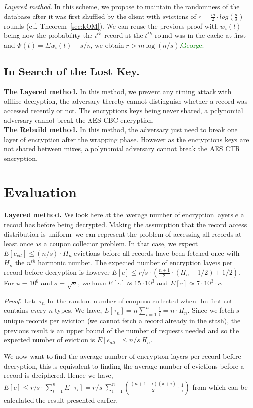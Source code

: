 \documentclass[USenglish,oneside,twocolumn]{article}
\newcommand{\george}[1]{\textcolor{green}{George: #1}}
\begin{document}
\noindent\textit{Layered method.}
In this scheme, we propose to maintain the randomness of the database after it was first shuffled by the client with evictions of $r=\frac{m}{2} \cdot log\left ( \frac{n}{s} \right )$ rounds (c.f. Theorem~\ref{sec:kOM}).
We can reuse the previous proof with $w_i(t)$ being now the probability the $i^{th}$ record at the $t^{th}$ round was in the cache at first and $\Phi(t)=\Sigma w_i(t) - s/n$, we obtain $r>m\log(n/s)$.\george{}

\subsection{In Search of the Lost Key.}
 
\noindent\textbf{The Layered method.}
In this method, we prevent any timing attack with offline decryption, the adversary thereby cannot distinguish whether a record was accessed recently or not. The encryptions keys being never shared, a polynomial adversary cannot break the AES CBC encryption.\\

\noindent\textbf{The Rebuild method.}
In this method, the adversary just need to break one layer of encryption after the wrapping phase. However as the encryptions keys are not shared between mixes, a polynomial adversary cannot break the AES CTR encryption.

\section{Evaluation}\label{Evaluation}
\textbf{Layered method.} We look here at the average number of encryption layers $e$ a record has before being decrypted. Making the assumption that the record access distribution is uniform, we can represent the problem of accessing all records at least once as a coupon collector problem. In that case, we expect $E[e_{all}]\leq(n/s)\cdot H_n$ evictions before all records have been fetched once with $H_n$ the $n^{th}$ harmonic number. The expected number of encryption layers per record before decryption is however $E[e]\leq{r/s} \cdot \left ( \frac{n+1}{2}\cdot(H_n-1/2)+1/2 \right )$. For $n=10^6$ and $s=\sqrt{n}$, we have $E[e]\approx 15 \cdot 10^3$ and $E[r]\approx 7\cdot 10^3 \cdot r$.
\begin{proof}
Lets $\tau_n$ be the random number of coupons collected when the first set contains every $n$ types. We have, $E[\tau_n]=n\sum_{i=1}^n \frac{1}{i} = n \cdot H_n$.
Since we fetch $s$ unique records per eviction (we cannot fetch a record already in the stash), the previous result is an upper bound of the number of requests needed and so the expected number of eviction is $E[e_{all}]\leq n/s\ H_n$.

We now want to find the average number of encryption layers per record before decryption, this is equivalent to finding the average number of evictions before a record is deciphered. 
Hence we have, $E[e]\leq r/s \cdot \sum_{i=1}^n E[\tau_i] = r/s\ \sum_{i=1}^n \left (\frac{(n+1-i)(n+i)}{2}\cdot \frac{1}{i}\right )$ from which can be calculated the result presented earlier. 
\end{proof}
\end{document}
